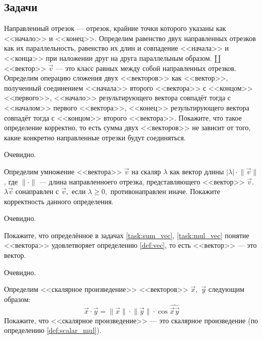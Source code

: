 \subsection*{Задачи}
\begin{task}
Направленный отрезок --- отрезок, крайние точки которого
указаны как <<начало>> и <<конец>>. Определим равенство двух
направленных отрезков как их параллельность, равенство их длин
и совпадение <<начала>> и <<конца>> при наложении друг на друга
параллельным образом.
$\amalg$ <<вектор>> $\vec{v}$ --- это класс равных между собой направленных отрезков.
Определим операцию сложения двух <<векторов>> как <<вектор>>,
полученный соединением <<начала>> второго <<вектора>> с <<концом>> <<первого>>,
<<начало>> результирующего вектора совпадёт тогда с <<началом>> первого <<вектора>>,
<<конец>> результирующего вектора совпадёт тогда с <<концом>> второго <<вектора>>.
Покажите, что такое определение корректно, то есть сумма двух <<векторов>>
не зависит от того, какие конкретно направленные отрезки будут соединяться.
\label{task:sum_vec}
\end{task}
\begin{solution}Очевидно.\end{solution}
\begin{task}
Определим умножение <<вектора>> $\vec{v}$ на скаляр $\lambda$
как вектор длины $\lvert \lambda \rvert \cdot \lVert \vec{v} \rVert$,
где $\lVert \cdot \rVert$ --- длина направленноего отрезка, представляющего
<<вектор>> $\vec{v}.$ $\lambda\vec{v}$ сонаправлен с $\vec{v},$ если
$\lambda \ge 0,$ противонаправлен иначе. Покажите корректность данного
определения.
\label{task:mul_vec}
\end{task}
\begin{solution}
Очевидно.
\end{solution}
\begin{task}Покажите, что определённое в задачах \ref{task:sum_vec}, \ref{task:mul_vec}
понятие <<вектора>> удовлетворяет определению \ref{def:vec}, то есть
<<вектор>> --- это вектор.
\end{task}
\begin{solution}
Очевидно.
\end{solution}
\begin{task}
Определим <<скалярное произведение>> <<векторов>> $\vec{x},$ $\vec{y}$
следующим образом:
$$\vec{x} \cdot \vec {y} = \lVert\vec{x} \rVert\cdot \lVert \vec{y} \rVert \cdot \cos \widehat{\vec{x}\vec{y}}$$
Покажите, что <<скалярное произведение>> --- это скалярное произведение (по определению \ref{def:scalar_mul}).
\end{task}
